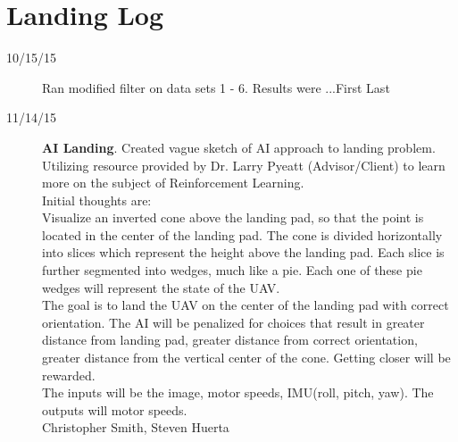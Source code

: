 \section{Landing Log}

\begin{description}
\item [10/15/15]  Ran modified filter on data sets 1 - 6.  Results were ...\hfill{First Last}

\item [11/14/15] \textbf{AI Landing}. Created vague sketch of AI approach to landing problem. Utilizing resource provided by Dr. Larry Pyeatt (Advisor/Client) to learn more on the subject of Reinforcement Learning. \\
Initial thoughts are:\\
Visualize an inverted cone above the landing pad, so that the point is located in the center of the landing pad. The cone is divided horizontally into slices which represent the height above the landing pad. Each slice is further segmented into wedges, much like a pie. Each one of these pie wedges will represent the state of the UAV. \\
The goal is to land the UAV on the center of the landing pad with correct orientation. The AI will be penalized for choices that result in greater distance from landing pad, greater distance from correct orientation, greater distance from the vertical center of the cone. Getting closer will be rewarded.\\
The inputs will be the image, motor speeds, IMU(roll, pitch, yaw). The outputs will motor speeds.\\

\hfill{Christopher Smith, Steven Huerta}
\end{description}
